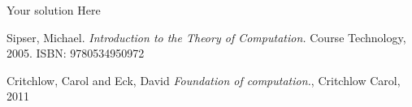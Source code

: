 \documentclass[12pt]{article}
\newenvironment{solution}[1][{\color{red} Solution:}]{\begin{trivlist}
\item[\hskip \labelsep {\bfseries #1}\hskip \labelsep {\bfseries}]}{\end{trivlist}}
\begin{document}
\begin{solution}
Your solution Here
\end{solution}


\vfill
\begin{thebibliography}{9}
Sipser, Michael. 
\textit{Introduction to the Theory of Computation.}
Course Technology, 2005. ISBN: 9780534950972

Critchlow, Carol and Eck, David
\textit{Foundation of computation.},
Critchlow Carol, 2011

\end{thebibliography}

 
\end{document}
